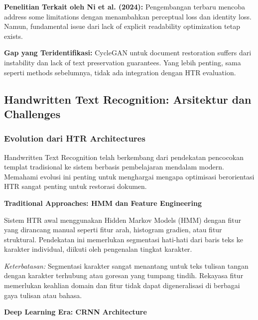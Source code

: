 \documentclass[12pt,a4paper]{article}
\begin{document}
\textbf{Penelitian Terkait oleh Ni et al. (2024):} Pengembangan terbaru mencoba address some limitations dengan menambahkan perceptual loss dan identity loss. Namun, fundamental issue dari lack of explicit readability optimization tetap exists.

\textbf{Gap yang Teridentifikasi:} CycleGAN untuk document restoration suffers dari instability dan lack of text preservation guarantees. Yang lebih penting, sama seperti methods sebelumnya, tidak ada integration dengan HTR evaluation.

\subsection{Handwritten Text Recognition: Arsitektur dan Challenges}
\label{subsec:htr-systems}

\subsubsection{Evolution dari HTR Architectures}
\label{subsubsec:htr-evolution}

Handwritten Text Recognition telah berkembang dari pendekatan pencocokan templat tradisional ke sistem berbasis pembelajaran mendalam modern. Memahami evolusi ini penting untuk menghargai mengapa optimisasi berorientasi HTR sangat penting untuk restorasi dokumen.

\textbf{Traditional Approaches: HMM dan Feature Engineering}

Sistem HTR awal menggunakan Hidden Markov Models (HMM) dengan fitur yang dirancang manual seperti fitur arah, histogram gradien, atau fitur struktural. Pendekatan ini memerlukan segmentasi hati-hati dari baris teks ke karakter individual, diikuti oleh pengenalan tingkat karakter.

\textit{Keterbatasan:} Segmentasi karakter sangat menantang untuk teks tulisan tangan dengan karakter terhubung atau goresan yang tumpang tindih. Rekayasa fitur memerlukan keahlian domain dan fitur tidak dapat digeneralisasi di berbagai gaya tulisan atau bahasa.

\textbf{Deep Learning Era: CRNN Architecture}
\end{document}
